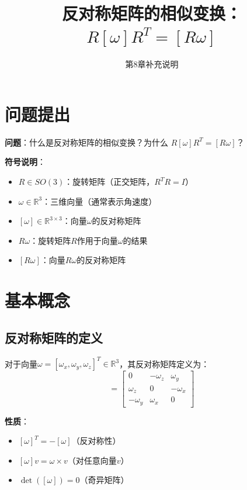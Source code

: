 \documentclass[12pt,a4paper]{article}
\title{反对称矩阵的相似变换：$R [\omega] R^T = [R \omega]$}
\author{第8章补充说明}
\date{}
\begin{document}
\maketitle

\section{问题提出}

\textbf{问题}：什么是反对称矩阵的相似变换？为什么 $R [\omega] R^T = [R \omega]$？

\textbf{符号说明}：
\begin{itemize}
\item $R \in SO(3)$：旋转矩阵（正交矩阵，$R^T R = I$）
\item $\omega \in \mathbb{R}^3$：三维向量（通常表示角速度）
\item $[\omega] \in \mathbb{R}^{3 \times 3}$：向量$\omega$的反对称矩阵
\item $R \omega$：旋转矩阵$R$作用于向量$\omega$的结果
\item $[R \omega]$：向量$R \omega$的反对称矩阵
\end{itemize}

\section{基本概念}

\subsection{反对称矩阵的定义}

对于向量$\omega = [\omega_x, \omega_y, \omega_z]^T \in \mathbb{R}^3$，其反对称矩阵定义为：
\begin{equation}
[\omega] = \begin{bmatrix}
0 & -\omega_z & \omega_y \\
\omega_z & 0 & -\omega_x \\
-\omega_y & \omega_x & 0
\end{bmatrix}
\end{equation}

\textbf{性质}：
\begin{itemize}
\item $[\omega]^T = -[\omega]$（反对称性）
\item $[\omega] v = \omega \times v$（对任意向量$v$）
\item $\det([\omega]) = 0$（奇异矩阵）
\end{itemize}
\end{document}
